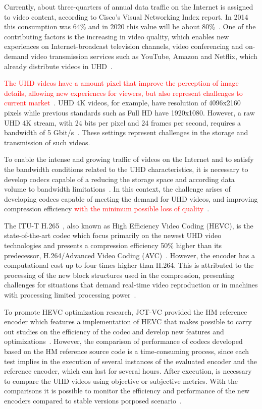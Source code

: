 \documentclass[journal]{IEEEtran}
\begin{document}
Currently, about three-quarters of annual data traffic on the Internet is assigned to video content, according to Cisco's Visual Networking Index report. In 2014 this consumption was 64\% and in 2020 this value will be about 80\%~\cite{Cisco:16}. One of the contributing factors is the increasing in video quality, which enables new experiences on Internet-broadcast television channels, video conferencing and on-demand video transmission services such as YouTube, Amazon and Netflix, which already distribute videos in UHD~\cite{cheon:14}.


\textcolor{red}{The UHD videos have a amount pixel that improve the perception of image details, allowing new experiences for viewers, but also represent challenges to current market~\cite{cheon:14}}. UHD 4K videos, for example, have resolution of 4096x2160 pixels while previous standards such as Full HD have 1920x1080. However, a raw UHD 4K stream, with 24 bits per pixel and 24 frames per second, requires a bandwidth of 5 Gbit/s~\cite{gomes:13}. These settings represent challenges in the storage and transmission of such videos.

To enable the intense and growing traffic of videos on the Internet and to satisfy the bandwidth conditions related to the UHD characteristics, it is necessary to develop codecs capable of a reducing the storage space and according data volume to bandwidth limitations~\cite{oliveira:16}\cite{wang:13}. In this context, the challenge arises of developing codecs capable of meeting the demand for UHD videos, and improving compression efficiency \textcolor{red}{with the minimum possible loss of quality~\cite{netflix:16}}.

The ITU-T H.265~\cite{itu:265}, also known as High Efficiency Video Coding (HEVC), is the state-of-the-art codec which focus primarily on the newest UHD video technologies and presents a compression efficiency 50\% higher than its predecessor, H.264/Advanced Video Coding (AVC)~\cite{Bossen:12}\cite{Hanhart:12}\cite{Sullivan:12}. However, the encoder has a computational cost up to four times higher than H.264. This is attributed to the processing of the new block structures used in the compression, presenting challenges for situations that demand real-time video reproduction or in machines with processing limited processing power~\cite{Yoon:13}\cite{Correa:12}.


To promote HEVC optimization research, JCT-VC provided the HM reference encoder which features a implementation of HEVC that makes possible  to carry out studies on the efficiency of the codec and develop new features and optimizations~\cite{itu:10}. However, the comparison of performance of codecs developed based on the HM reference source code is a time-consuming process, since each test implies in the execution of several instances of the evaluated encoder and the reference encoder, which can last for several hours. After execution, is necessary to compare the UHD videos using objective or subjective metrics. With the comparisons it is possible to monitor the efficiency and performance of the new encoders compared to stable versions porposed scenario~\cite{netflix:16}.
\end{document}
